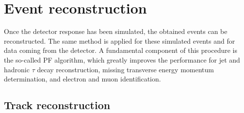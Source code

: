 \section{Event reconstruction}
\label{sec:reconstruction}

Once the detector response has been simulated, the obtained events can be reconstructed. The same method is applied for these simulated events and for data coming from the detector. A fundamental component of this procedure is the so-called \acf{PF} algorithm, which greatly improves the performance for jet and hadronic $\tau$ decay reconstruction, missing transverse energy momentum determination, and electron and muon identification.

\subsection{Track reconstruction}
\label{sec:tracking}

